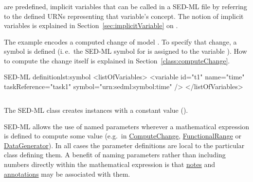 \subsubsection{}
\label{sec:symbol}

 are predefined, implicit variables that can be called in a SED-ML file by referring to the defined URNs representing that variable's concept. The notion of implicit variables is explained in Section~\ref{sec:implicitVariable} on .

The example encodes a computed change of model . To specify that change, a symbol is defined (i.\,e.\  the SED-ML symbol for  is assigned to the variable ). How to compute the change itself is explained in Section~\ref{class:computeChange}.
%
\begin{myXmlLst}{SED-ML  definition}{lst:symbol}
  <listOfVariables>
    <variable id="t1" name="time" taskReference="task1" 
      symbol="urn:sedml:symbol:time" />
  </listOfVariables>
\end{myXmlLst}


\subsection{}
\label{class:parameter}
The SED-ML  class creates instances with a constant value ().


SED-ML allows the use of named parameters wherever a mathematical expression is defined to compute some value (e.g.\ in \hyperref[class:computeChange]{ComputeChange}, \hyperref[class:functionalRange]{FunctionalRange} or \hyperref[class:dataGenerator]{DataGenerator}). In all cases the parameter definitions are local to the particular class defining them. A benefit of naming parameters rather than including numbers directly within the mathematical expression is that \hyperref[class:notes]{notes} and \hyperref[class:annotation]{annotations} may be associated with them.


